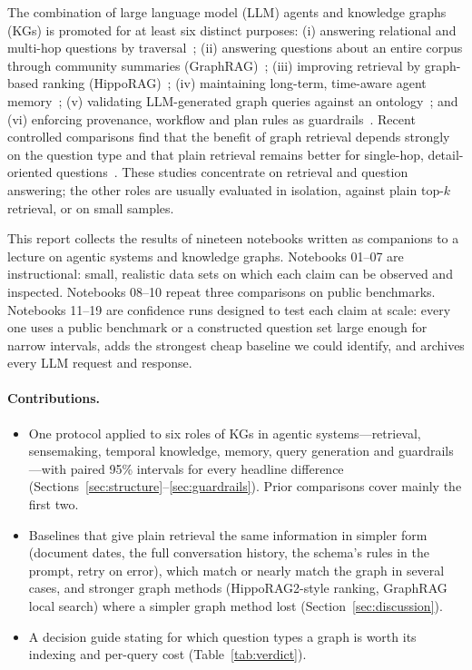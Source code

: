 \documentclass[11pt,a4paper]{article}
\begin{document}
The combination of large language model (LLM) agents and knowledge graphs (KGs) is promoted for at least six
distinct purposes: (i) answering relational and multi-hop questions by traversal~\cite{yao2023react,sun2024thinkongraph};
(ii) answering questions about an entire corpus through community summaries (GraphRAG)~\cite{edge2024graphrag};
(iii) improving retrieval by graph-based ranking (HippoRAG)~\cite{gutierrez2024hipporag,gutierrez2025hipporag2};
(iv) maintaining long-term, time-aware agent memory~\cite{rasmussen2025zep};
(v) validating LLM-generated graph queries against an ontology~\cite{sequeda2023benchmark,allemang2024ontologies};
and (vi) enforcing provenance, workflow and plan rules as guardrails~\cite{debenedetti2025camel,beurerkellner2025patterns}.
Recent controlled comparisons find that the benefit of graph retrieval depends strongly on the question type and
that plain retrieval remains better for single-hop, detail-oriented questions~\cite{han2025ragvsgraphrag,zhou2025unified,xiang2025graphragbench}.
These studies concentrate on retrieval and question answering; the other roles are usually evaluated in isolation,
against plain top-$k$ retrieval, or on small samples.

This report collects the results of nineteen notebooks written as companions to a lecture on agentic systems and
knowledge graphs. Notebooks 01--07 are instructional: small, realistic data sets on which each claim can be
observed and inspected. Notebooks 08--10 repeat three comparisons on public benchmarks. Notebooks 11--19 are
confidence runs designed to test each claim at scale: every one uses a public benchmark or a constructed question
set large enough for narrow intervals, adds the strongest cheap baseline we could identify, and archives every LLM
request and response.

\paragraph{Contributions.}
\begin{itemize}
  \item One protocol applied to six roles of KGs in agentic systems---retrieval, sensemaking, temporal knowledge,
        memory, query generation and guardrails---with paired 95\% intervals for every headline difference
        (Sections~\ref{sec:structure}--\ref{sec:guardrails}). Prior comparisons cover mainly the first two.
  \item Baselines that give plain retrieval the same information in simpler form (document dates, the full
        conversation history, the schema's rules in the prompt, retry on error), which match or nearly match the
        graph in several cases, and stronger graph methods (HippoRAG2-style ranking, GraphRAG local search) where a simpler
        graph method lost (Section~\ref{sec:discussion}).
  \item A decision guide stating for which question types a graph is worth its indexing and per-query cost
        (Table~\ref{tab:verdict}).
\end{itemize}
\end{document}
